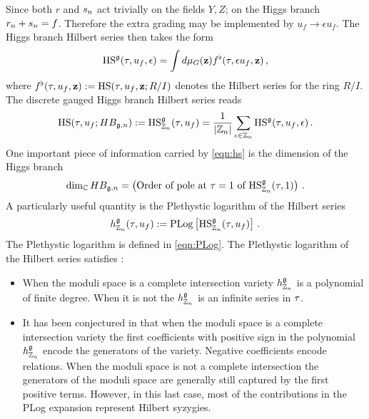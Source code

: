 \documentclass[main.tex]{subfiles}
\begin{document}
Since both $r$ and $s_{n}$ act trivially on the fields $Y,Z$; on the Higgs branch $r_{n}+ s_{n}=f$. Therefore the extra grading may be implemented by $u_f\to\epsilon u_f$. The Higgs branch Hilbert series then takes the form
\begin{equation}
\textrm{HS}^{\mathfrak{g}}(\tau,u_f,\epsilon)=\int d\mu_{G}(\mathbf{z})f^{\flat}(\tau,\epsilon u_f,\mathbf{z})\,,
\end{equation}
where $f^{\flat}(\tau,u_f,\mathbf{z}):=\textrm{HS}(\tau,u_f,\mathbf{z};R/I)$ denotes the Hilbert series for the ring $R/I$. The discrete gauged Higgs branch Hilbert series reads
\begin{equation}
\label{eq:HIggsHS}
\textrm{HS}(\tau,u_f;HB_{\mathfrak{g},n}):=\textrm{HS}^{\mathfrak{g}}_{\mathbb{Z}_{n}}(\tau,u_f)=\frac{1}{|\mathbb{Z}_{n}|}\sum_{\epsilon\in\mathbb{Z}_{n}}\textrm{HS}^{\mathfrak{g}}(\tau,u_f,\epsilon)\, .
\end{equation}
One important piece of information carried by \eqref{eqn:hs} is the dimension of the Higgs branch 
\begin{equation}\label{eqn:dimHB}
\dim_{\mathbb{C}}HB_{\mathfrak{g},n}=\left(\text{Order of pole at $\tau=1$ of $\textrm{HS}^{\mathfrak{g}}_{\mathbb{Z}_{n}}(\tau,1)$}\right)\,.
\end{equation} 
A particularly useful quantity is the Plethystic logarithm of the Hilbert series 
\begin{equation}
h^{\mathfrak{g}}_{\mathbb{Z}_{n}}(\tau,u_f):=\operatorname{\mathrm{PLog}}\left[\textrm{HS}^{\mathfrak{g}}_{\mathbb{Z}_{n}}(\tau,u_f)\right]\,.
\end{equation}
The Plethystic logarithm is defined in \eqref{eqn:PLog}.
The Plethystic logarithm of the Hilbert series satisfies \cite{Benvenuti:2006qr,DelZotto:2014kka}:
\begin{itemize}
\item When the moduli space is a complete intersection variety $h^{\mathfrak{g}}_{\mathbb{Z}_{n}}$ is a polynomial of finite degree. When it is not the $h^{\mathfrak{g}}_{\mathbb{Z}_{n}}$ is an infinite series in $\tau$.
\item It has been conjectured in \cite{Feng:2007ur,Benvenuti:2006qr} that when the moduli space is a complete intersection variety the first coefficients with positive sign in the polynomial $h^{\mathfrak{g}}_{\mathbb{Z}_{n}}$ encode the generators of the variety. Negative coefficients encode relations. When the moduli space is not a complete intersection the generators of the moduli space are generally still captured by the first positive terms. However, in this last case, most of the contributions in the PLog expansion represent Hilbert syzygies.\end{itemize}
\end{document}
